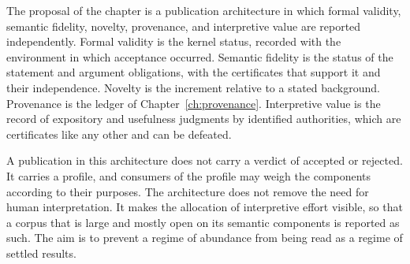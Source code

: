The proposal of the chapter is a publication architecture in which formal validity, semantic fidelity, novelty, provenance, and interpretive value are reported independently. Formal validity is the kernel status, recorded with the environment in which acceptance occurred. Semantic fidelity is the status of the statement and argument obligations, with the certificates that support it and their independence. Novelty is the increment relative to a stated background. Provenance is the ledger of Chapter~\ref{ch:provenance}. Interpretive value is the record of expository and usefulness judgments by identified authorities, which are certificates like any other and can be defeated.

A publication in this architecture does not carry a verdict of accepted or rejected. It carries a profile, and consumers of the profile may weigh the components according to their purposes. The architecture does not remove the need for human interpretation. It makes the allocation of interpretive effort visible, so that a corpus that is large and mostly open on its semantic components is reported as such. The aim is to prevent a regime of abundance from being read as a regime of settled results.
